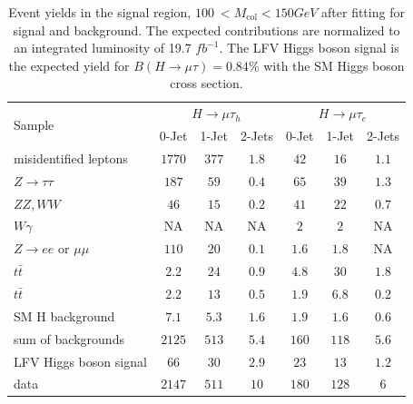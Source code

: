 \documentclass[oneside, letterpaper, oldfontcommands]{memoir}
\begin{document}
\begin{table}[hbtp]
 \centering
  \caption{Event yields in the signal region,  $100\: <  M_\text{col} < 150GeV $ after fitting for signal and background. The expected contributions are normalized to an integrated luminosity
of 19.7 $fb^{-1}$. The LFV Higgs boson signal is the expected yield for $B(H \rightarrow \mu \tau)=0.84\%$ with the SM Higgs boson cross section.}
  \label{tab:EventYieldTable_100_to_150}
  \begin{tabular}{lccc|ccc} \hline
        \multirow{2}{*}{Sample}                                & \multicolumn{3}{c}{$H \rightarrow \mu \tau_{h}$}                &     \multicolumn{3}{c}{$H \rightarrow \mu \tau_{e}$}     \\ \cline{2-7}
                                              &  0-Jet            & 1-Jet            & 2-Jets               &  0-Jet             & 1-Jet            & 2-Jets  \\ \hline
    misidentified leptons                          &  $  1770$      & $   377 $      &  $     1.8 $&  $    42$    &$    16$      & $     1.1$  \\
    $ Z \rightarrow \tau \tau$                        &  $   187$     & $    59$      &  $     0.4$&  $    65$    &$    39$      & $     1.3$   \\
    $ ZZ,WW$                                  &  $    46$      & $    15$      &  $     0.2$&  $    41$    &$    22$      & $     0.7 $    \\
    $ W\gamma$                                &  NA  & NA  &  NA &  $     2$    &$     2$      & NA    \\
    $ Z \rightarrow ee$ or $\mu \mu$                  &  $   110 $      & $    20 $      &  $     0.1 $&  $     1.6 $&$     1.8 $  & NA                  \\
    $t\bar{t}     $                      &  $     2.2 $  & $    24 $      &  $     0.9 $&  $     4.8 $&$    30 $      & $     1.8 $   \\
    $t\bar{t}   $                      &  $     2.2 $  & $    13 $      &  $     0.5 $&  $     1.9 $&$     6.8 $  & $     0.2 $   \\
    SM H background                       &  $     7.1 $  & $     5.3 $  &  $     1.6$&  $     1.9 $&$     1.6 $  & $     0.6 $    \\
    sum of backgrounds                        &  $  2125 $      & $   513 $      &  $     5.4 $&  $   160 $    &$   118 $     & $     5.6 $    \\   \hline
    LFV Higgs boson signal                          &  $    66 $      & $    30$      &  $     2.9 $&  $    23 $    &$    13 $      & $     1.2 $    \\   \hline
    data                                      &  $  2147 $             & $   511 $             &  $    10 $           &  $   180 $           &$   128 $             & $     6 $    \\   \hline
  \end{tabular}

\end{table}
\end{document}
